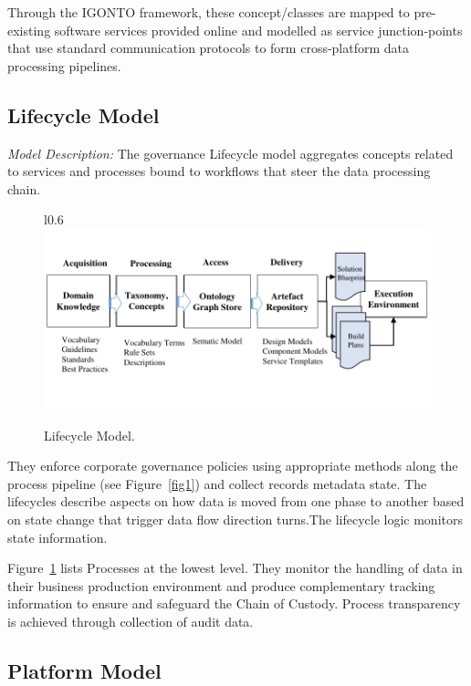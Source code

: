 \documentclass[runningheads]{llncs}
\begin{document}
Through the IGONTO framework, these concept/classes are mapped to pre-existing software services provided online and modelled as service junction-points that use standard communication protocols to form cross-platform data processing pipelines.
\subsection{Lifecycle Model}

\textit{Model Description:} The governance Lifecycle model aggregates concepts related to services and processes bound to workflows that steer the data processing chain. 
\begin{figure} {l}{0.6\textwidth}
\includegraphics[page=9, scale=0.5]{figs/IGSModelsMedium.pdf} 
\caption{Lifecycle Model.} \label{fig9}
\end{figure}
They enforce corporate governance policies using appropriate methods along the process pipeline (see Figure~\ref{fig1}) and collect records metadata state. The lifecycles describe aspects on how data is moved from one phase to another based on state change that trigger data flow direction turns.The lifecycle logic monitors state information.  

Figure~\ref{fig9} lists Processes at the lowest level. They monitor the handling of data in their business production environment and produce complementary tracking information to ensure and safeguard the Chain of Custody. Process transparency is achieved through collection of audit data.

\subsection{Platform Model}
\end{document}
